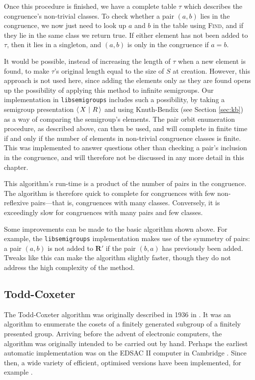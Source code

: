 Once this procedure is finished, we have a complete table $\tau$ which describes
the congruence's non-trivial classes.  To check whether a pair $(a,b)$ lies in
the congruence, we now just need to look up $a$ and $b$ in the table using
\textsc{Find}, and if they lie in the same class we return true.  If either
element has not been added to $\tau$, then it lies in a singleton, and $(a,b)$
is only in the congruence if $a=b$.

It would be possible, instead of increasing the length of $\tau$ when a new
element is found, to make $\tau$'s original length equal to the size of $S$ at
creation.  However, this approach is not used here, since adding the elements only as
they are found opens up the possibility of applying this method to infinite
semigroups.  Our implementation in \texttt{libsemigroups} \cite{libsemigroups}
includes such a possibility, by taking a semigroup presentation $\left\langle\,X ~\middle|~ R\,\right\rangle$ and
using Knuth-Bendix (see Section \ref{sec:kb}) as a way of comparing the semigroup's
elements.  The pair orbit enumeration procedure, as described above, can then be
used, and will complete in finite time if and only if the number of elements in
non-trivial congruence classes is finite.  This was implemented to answer
questions other than checking a pair's inclusion in the congruence, and will
therefore not be discussed in any more detail in this chapter.

This algorithm's run-time is a product of the number of pairs in the congruence.
The algorithm is therefore quick to complete for congruences with few
non-reflexive pairs---that is, congruences with many classes.  Conversely, it is
exceedingly slow for congruences with many pairs and few classes.

Some improvements can be made to the basic algorithm shown above.  For example,
the \texttt{libsemigroups} implementation makes use of the symmetry of pairs: a
pair $(a,b)$ is not added to $\mathbf{R}'$ if the pair $(b,a)$ has previously
been added.  Tweaks like this can make the algorithm slightly faster, though
they do not address the high complexity of the method.

\subsection{Todd-Coxeter}
\label{sec:tc}

The Todd-Coxeter algorithm was originally described in 1936 in
\cite{todd_coxeter_1936}.  It was an algorithm to enumerate the cosets of a
finitely generated subgroup of a finitely presented group.  Arriving before the
advent of electronic computers, the algorithm was originally intended to be
carried out by hand.  Perhaps the earliest automatic implementation was on the
EDSAC II computer in Cambridge \cite{leech_1963}.  Since then, a wide variety of
efficient, optimised versions have been implemented, for example \cite{ace}.

